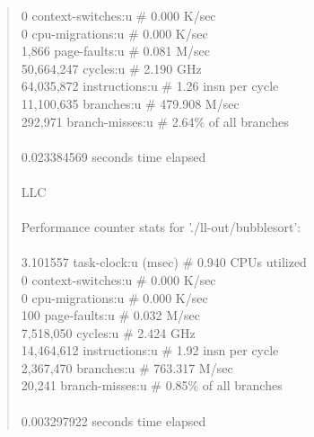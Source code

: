 \documentclass[12pt]{report}
\begin{document}
\begin{quote}
                 0      context-switches:u        \#    0.000 K/sec                   \\ 
                 0      cpu-migrations:u          \#    0.000 K/sec                   \\ 
             1,866      page-faults:u             \#    0.081 M/sec                   \\ 
        50,664,247      cycles:u                  \#    2.190 GHz                     \\ 
        64,035,872      instructions:u            \#    1.26  insn per cycle          \\ 
        11,100,635      branches:u                \#  479.908 M/sec                   \\ 
           292,971      branch-misses:u           \#    2.64\% of all branches        \\ 
                                                                                      \\ 
       0.023384569 seconds time elapsed                                               \\ 
                                                                                      \\ 
LLC                                                                                     \\ 
                                                                                      \\ 
 Performance counter stats for './ll-out/bubblesort':                                 \\ 
                                                                                      \\ 
          3.101557      task-clock:u (msec)       \#    0.940 CPUs utilized           \\ 
                 0      context-switches:u        \#    0.000 K/sec                   \\ 
                 0      cpu-migrations:u          \#    0.000 K/sec                   \\ 
               100      page-faults:u             \#    0.032 M/sec                   \\ 
         7,518,050      cycles:u                  \#    2.424 GHz                     \\ 
        14,464,612      instructions:u            \#    1.92  insn per cycle          \\ 
         2,367,470      branches:u                \#  763.317 M/sec                   \\ 
            20,241      branch-misses:u           \#    0.85\% of all branches        \\ 
                                                                                      \\
       0.003297922 seconds time elapsed                                               \\
\end{quote}
\end{document}
